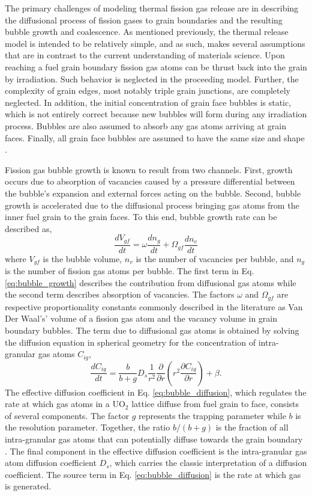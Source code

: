 The primary challenges of modeling thermal fission gas release are in describing the diffusional process of fission gases to grain boundaries and the resulting bubble growth and coalescence. As mentioned previously, the thermal release model is intended to be relatively simple, and as such, makes several assumptions that are in contrast to the current understanding of materials science. Upon reaching a fuel grain boundary fission gas atoms can be thrust back into the grain by irradiation. Such behavior is neglected in the proceeding model. Further, the complexity of grain edges, most notably triple grain junctions, are completely neglected. In addition, the initial concentration of grain face bubbles is static, which is not entirely correct because new bubbles will form during any irradiation process. Bubbles are also assumed to absorb any gas atoms arriving at grain faces. Finally, all grain face bubbles are assumed to have the same size and shape \cite{Pastore1}.  

Fission gas bubble growth is known to result from two channels. First, growth occurs due to absorption of vacancies caused by a pressure differential between the bubble's expansion and external forces acting on the bubble. Second, bubble growth is accelerated due to the diffusional process bringing gas atoms from the inner fuel grain to the grain faces. To this end, bubble growth rate can be described as,
\begin{equation}
\label{eq:bubble_growth}
 \frac{dV_{gf}}{dt} = \omega\frac{dn_g}{dt} + \Omega_{gf}\frac{dn_v}{dt}  
\end{equation}  
where $V_{gf}$ is the bubble volume, $n_v$ is the number of vacancies per bubble, and $n_g$ is the number of fission gas atoms per bubble. The first term in Eq. \ref{eq:bubble_growth} describes the contribution from diffusional gas atoms while the second term describes absorption of vacancies. The factors $\omega$ and $\Omega_{gf}$ are respective proportionality constants commonly described in the literature as Van Der Waal's' volume  of a fission gas atom and the vacancy volume in grain boundary bubbles. The term due to diffusional gas atoms is obtained by solving the diffusion equation in spherical geometry for the concentration of intra-granular gas atoms $C_{ig}$,
\begin{equation}
\label{eq:bubble_diffusion}
 \frac{dC_{ig}}{dt} = \frac{b}{b+g}D_s \frac{1}{r^2} \frac{\partial}{\partial r} \left(r^2 \frac{\partial C_{ig}}{\partial r} \right) +\beta.
\end{equation}
The effective diffusion coefficient in Eq. \ref{eq:bubble_diffusion}, which regulates the rate at which gas atoms in a UO$_2$ lattice diffuse from fuel grain to face, consists of several components. The factor $g$ represents the trapping parameter while $b$ is the resolution parameter. Together, the ratio $b/(b+g)$ is the fraction of all intra-granular gas atoms that can potentially diffuse towards the grain boundary \cite{Pastore3}. The final component in the effective diffusion coefficient is the intra-granular gas atom diffusion coefficient $D_s$, which carries the classic interpretation of a diffusion coefficient. The source term in Eq. \ref{eq:bubble_diffusion} is the rate at which gas is generated. 

